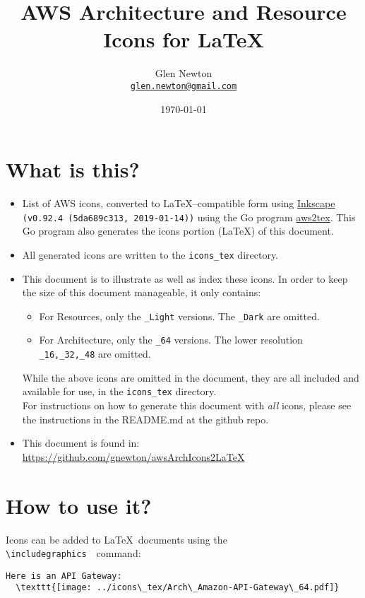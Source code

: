 \documentclass[12pt]{article}
\title{AWS Architecture and Resource Icons for \LaTeX}
\author{Glen Newton \\\texttt{\href{mailto:glen.newton@gmail.com}{glen.newton@gmail.com}}}
\date{\today}
\begin{document}
\maketitle
\tableofcontents\label{toc}
\noindent\makebox[\linewidth]{\rule{\paperwidth}{0.4pt}}

\section{What is this?}
\begin{itemize}
\item List of AWS icons, converted to {\LaTeX}--compatible form using \href{https://inkscape.org/}{Inkscape} {\tt (v0.92.4 (5da689c313, 2019-01-14))}
  using the Go program \href{https://github.com/gnewton/awsArchIcons2LaTeX/aws2tex}{aws2tex}.
  This Go program also generates the icons portion (\LaTeX) of this document.
\item All generated icons are written to the \texttt{icons\_tex} directory.
\item This document is to illustrate as well as index these icons. In order to keep the size of this document manageable, it only contains:
  \begin{itemize}
  \item For Resources, only the \texttt{\_Light} versions. The \texttt{\_Dark} are omitted.
  \item For Architecture, only the \texttt{\_64} versions. The lower resolution \texttt{\_16,\_32,\_48} are omitted.
  \end{itemize}
  While the above icons are omitted in the document, they are all included and available for use, in the \texttt{icons\_tex} directory.\\
  For instructions on how to generate this document with \textit{all} icons, please see the instructions in the README.md at the github repo.
\item This document is found in: \url{https://github.com/gnewton/awsArchIcons2LaTeX}
\end{itemize}


\section{How to use it?}
Icons can be added to \LaTeX\ documents using the \texttt{{\textbackslash}includegraphics}\ \ command:

\begin{blockquote}
\begin{verbatim}
Here is an API Gateway: 
  \texttt{[image: ../icons\_tex/Arch\_Amazon-API-Gateway\_64.pdf]}
\end{verbatim}
\end{blockquote}
\end{document}
